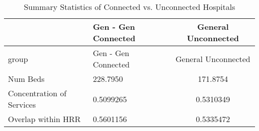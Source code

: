 \begin{table}[ht!]

\caption{Summary Statistics of Connected vs. Unconnected Hospitals}
\centering
\begin{tabular}[t]{llc}
\toprule
  & Gen - Gen Connected & General Unconnected\\
\midrule
group & Gen - Gen Connected & General Unconnected\\
Num Beds & 228.7950 & 171.8754\\
Concentration of Services & 0.5099265 & 0.5310349\\
Overlap within HRR & 0.5601156 & 0.5335472\\
\bottomrule
\end{tabular}
\end{table}
